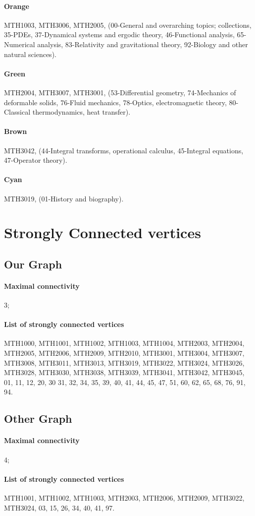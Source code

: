 \documentclass[english, 12pt]{article}
\begin{document}
\paragraph{Orange} MTH1003, MTH3006, MTH2005, (00-General and overarching topics; collections, 35-PDEs, 37-Dynamical systems and ergodic theory, 46-Functional analysis, 65-Numerical analysis, 83-Relativity and gravitational theory, 92-Biology and other natural sciences).
\paragraph{Green} MTH2004, MTH3007, MTH3001, (53-Differential geometry, 74-Mechanics of deformable solids, 76-Fluid mechanics, 78-Optics, electromagnetic theory, 80-Classical thermodynamics, heat transfer).
\paragraph{Brown} MTH3042, (44-Integral transforms, operational calculus, 45-Integral equations, 47-Operator theory).
\paragraph{Cyan} MTH3019, (01-History and biography).
\parskip=0.0pt

\section{Strongly Connected vertices} \label{app:strongly_connected_vertices}
\subsection{Our Graph}
\paragraph{Maximal connectivity} 3;
\parskip=-8.0pt
\paragraph{List of strongly connected vertices} MTH1000, MTH1001, MTH1002, MTH1003, MTH1004, MTH2003, MTH2004, MTH2005, MTH2006, MTH2009, MTH2010, MTH3001, MTH3004, MTH3007, MTH3008, MTH3011, MTH3013, MTH3019, MTH3022, MTH3024, MTH3026, MTH3028, MTH3030, MTH3038, MTH3039, MTH3041, MTH3042, MTH3045, 01, 11, 12, 20, 30 31, 32, 34, 35, 39, 40, 41, 44, 45, 47, 51, 60, 62, 65, 68, 76, 91, 94.
\parskip=0.0pt

\subsection{Other Graph}
\paragraph{Maximal connectivity} 4;
\parskip=-8.0pt
\paragraph{List of strongly connected vertices} MTH1001, MTH1002, MTH1003, MTH2003, MTH2006, MTH2009, MTH3022, MTH3024, 03, 15, 26, 34, 40, 41, 97.
\parskip=0.0pt
\end{document}
